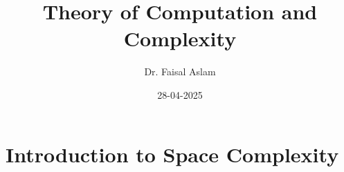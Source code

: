 \documentclass{report}
\title{Theory of Computation and Complexity}
\author{Dr. Faisal Aslam}
\date{28-04-2025}
\theoremstyle{remark}
\begin{document}
\maketitle

\tableofcontents  %

\chapter{Introduction to Space Complexity}
\end{document}
